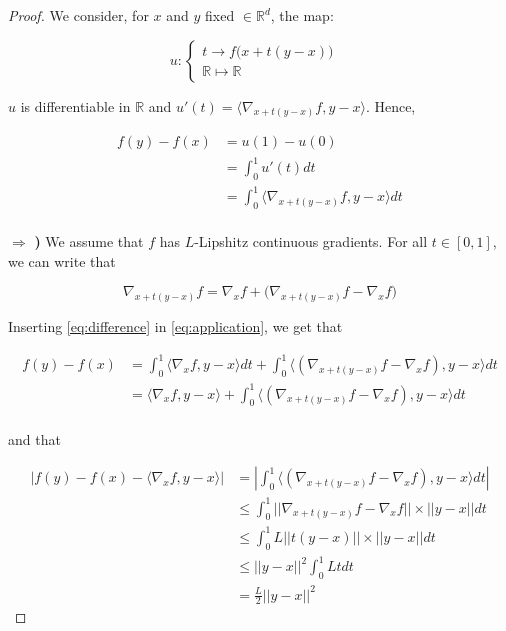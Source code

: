 \documentclass[
10pt, %
a4paper, %
oneside, %
headinclude,footinclude, %
BCOR5mm, %
]{scrartcl}
\begin{document}
\begin{proof}
    We consider, for $x$ and $y$ fixed $\in \mathbb{R}^d$, the map:

$$
u  : \left\{
    \begin{array}{ll}
	t\rightarrow f\big(x+t(y-x)\big) & \\
        \mathbb{R}  \mapsto \mathbb{R} & 
    \end{array}
\right.
$$

    $u$ is differentiable in $ \mathbb{R} $ and $u'(t) = \langle\nabla_{x+t(y-x)}f, y-x \rangle$. Hence, 

    \begin{equation}
	\begin{aligned}
	    \label{eq:application}
	    f(y)-f(x) &= u(1)-u(0)\\
	    &= \int^{1}_{0} u'(t)  dt \\
	    &= \int^{1}_{0}  \langle\nabla_{x+t(y-x)}f, y-x \rangle dt \\
	\end{aligned}
    \end{equation}

    $\Rightarrow$ \textbf{{)}}  We assume that $f$ has $L$-Lipshitz continuous gradients.  For all $t\in [0, 1]$, we can write that

    \begin{equation}
	\label{eq:difference}
	\nabla_{x+t(y-x)}f = \nabla_{x}f +\Big(\nabla_{x+t(y-x)}f- \nabla_{x}f\Big) 
    \end{equation}

    Inserting \ref{eq:difference} in \ref{eq:application}, we get that

    \begin{equation}
	\begin{aligned}
	    \label{eq:}
	    f(y)-f(x) &= \int^{1}_{0} \langle\nabla_{x}f, y-x \rangle dt +\int^{1}_{0}  \langle(\nabla_{x+t(y-x)}f- \nabla_{x}f) , y-x \rangle   dt \\
	    &= \langle\nabla_{x}f, y-x \rangle +\int^{1}_{0}  \langle(\nabla_{x+t(y-x)}f- \nabla_{x}f) , y-x \rangle   dt \\
	\end{aligned}
    \end{equation}

    and that

    \begin{equation}
        \begin{aligned}
            \label{eq:}
	    |f(y)-f(x)-\langle\nabla_{x}f, y-x \rangle| &= |\int^{1}_{0}  \langle(\nabla_{x+t(y-x)}f- \nabla_{x}f) , y-x \rangle   dt |\\
	    &\leq  \int^{1}_{0}  ||\nabla_{x+t(y-x)}f- \nabla_{x}f||\times || y-x|| dt \\
	    &\leq  \int^{1}_{0}  L||t(y-x)||\times|| y-x|| dt \\
	    &\leq  ||y-x||^2\int^{1}_{0}  Ltdt\\
	    &= \frac{L}{2} ||y-x||^2
        \end{aligned}
    \end{equation}

\end{proof}
\end{document}
